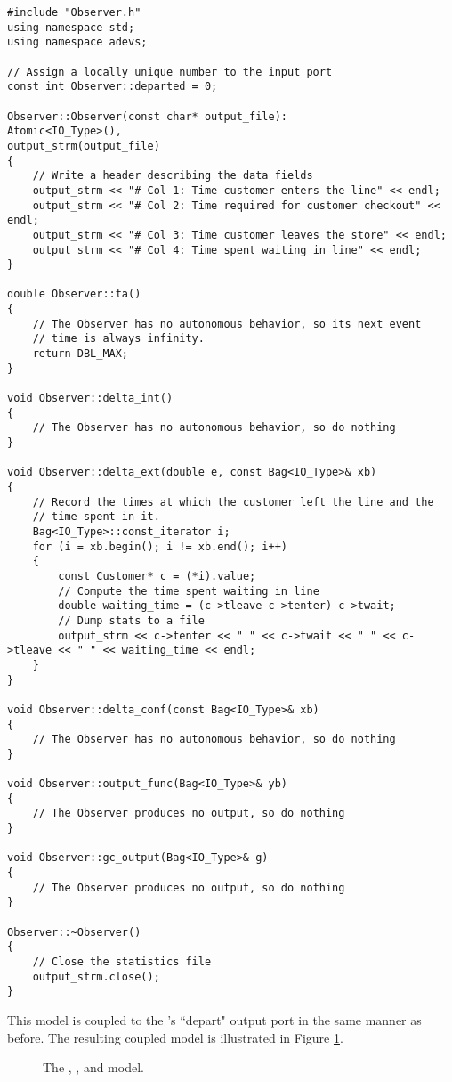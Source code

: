 \begin{verbatim}
#include "Observer.h"
using namespace std;
using namespace adevs;

// Assign a locally unique number to the input port
const int Observer::departed = 0;

Observer::Observer(const char* output_file):
Atomic<IO_Type>(),
output_strm(output_file)
{
    // Write a header describing the data fields
    output_strm << "# Col 1: Time customer enters the line" << endl;
    output_strm << "# Col 2: Time required for customer checkout" << endl;
    output_strm << "# Col 3: Time customer leaves the store" << endl;
    output_strm << "# Col 4: Time spent waiting in line" << endl;
}

double Observer::ta()
{
    // The Observer has no autonomous behavior, so its next event
    // time is always infinity.
    return DBL_MAX;
}

void Observer::delta_int()
{
    // The Observer has no autonomous behavior, so do nothing
}

void Observer::delta_ext(double e, const Bag<IO_Type>& xb)
{
    // Record the times at which the customer left the line and the
    // time spent in it.
    Bag<IO_Type>::const_iterator i;
    for (i = xb.begin(); i != xb.end(); i++)
    {
        const Customer* c = (*i).value;
        // Compute the time spent waiting in line 
        double waiting_time = (c->tleave-c->tenter)-c->twait;
        // Dump stats to a file
        output_strm << c->tenter << " " << c->twait << " " << c->tleave << " " << waiting_time << endl;
    }
}

void Observer::delta_conf(const Bag<IO_Type>& xb)
{
    // The Observer has no autonomous behavior, so do nothing
}

void Observer::output_func(Bag<IO_Type>& yb)
{
    // The Observer produces no output, so do nothing
}

void Observer::gc_output(Bag<IO_Type>& g)
{
    // The Observer produces no output, so do nothing
}

Observer::~Observer()
{
    // Close the statistics file
    output_strm.close();
}
\end{verbatim}

This model is coupled to the 's ``depart" output port in the same manner as before. The resulting coupled model is illustrated in Figure \ref{fig:complete_store_model}. 
\begin{figure}[ht]
\centering
{}
\caption{The , , and  model.} 
\label{fig:complete_store_model}
\end{figure}

